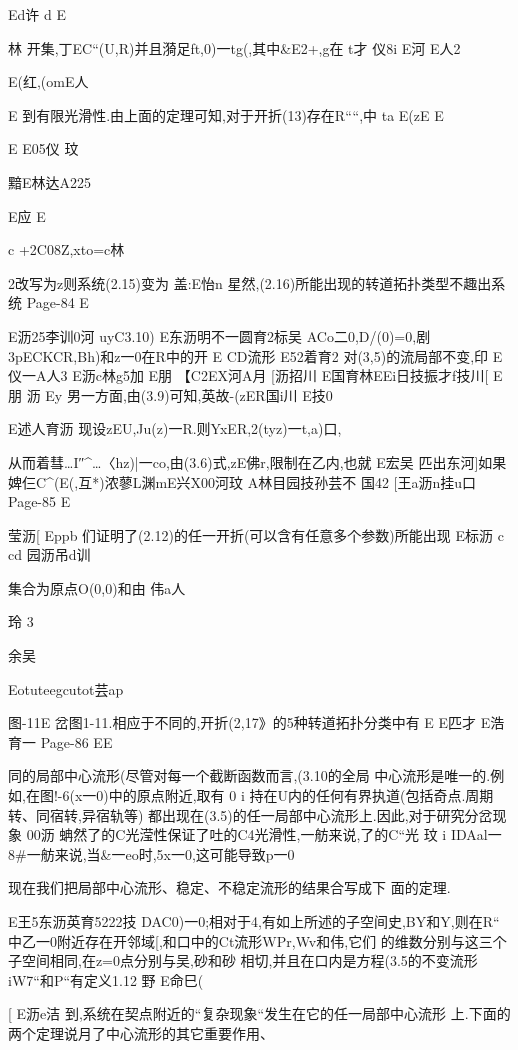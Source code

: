 {{{Ed许
d
E

林
开集,丁EC“(U,R)并且漪足ft,0)一tg(,其中&E2+,g在
t才
仪8i
E河
E人2

E(红,(omE人

E
到有限光滑性.由上面的定理可知,对于开折(13)存在R““,中
ta
E(zE
E

E
E05仪
玟

黯E林达A225

E应
E

c
+2C08Z,xto=c林

2改写为z则系统(2.15)变为
盖:E怡n
星然,(2.16)所能出现的转道拓扑类型不趣出系统
Page-84
E

E沥25李训0河
uyC3.10)
E东沥明不一圆育2标吴
ACo二0,D/(0)=0,剧3pECKCR,Bh)和z一0在R中的开
E
CD流形
E52着育2
对(3,5)的流局部不变,印
E仪一A人3
E沥c林g5加
E朋
【C2EX河A月
[沥招川
E国育林EEi日技振才f技川[
E朋
沥
Ey
男一方面,由(3.9)可知,英故-(zER国i川
E技0

E述人育沥
现设zEU,Ju(z)一R.则YxER,2(tyz)一t,a)口,

从而着彗…I″^…〈hz)|一co,由(3.6)式,zE佛r,限制在乙内,也就
E宏吴
匹出东河]如果婢仨C^(E(,互*)浓蓼L渊mE兴X00河玟
A林目园技孙芸不
国42
[王a沥n挂u口
Page-85
E

莹沥[
Eppb
们证明了(2.12)的任一开折(可以含有任意多个参数)所能出现
E标沥
c
cd
园沥吊d训

集合为原点O(0,0)和由
伟a人

玲
3

余吴

Eotuteegcutot芸ap

图-11E
岔图1-11.相应于不同的,开折(2,17》的5种转道拓扑分类中有
E
E匹才
E浩育一
Page-86
EE

同的局部中心流形(尽管对每一个截断函数而言,(3.10的全局
中心流形是唯一的.例如,在图!-6(x一0)中的原点附近,取有
0
i
持在U内的任何有界执道(包括奇点.周期转、同宿转,异宿轨等)
都出现在(3.5)的任一局部中心流形上.因此,对于研究分岔现象
00沥
蚺然了的C光滢性保证了吐的C4光滑性,一舫来说,了的C“光
玟
i
IDAal一8#一舫来说,当&一eo时,5x一0,这可能导致p一0

现在我们把局部中心流形、稳定、不稳定流形的结果合写成下
面的定理.

E王5东沥英育5222技
DAC0)一0;相对于4,有如上所述的子空间史,BY和Y,则在R“
中乙一0附近存在开邻域[,和口中的Ct流形WPr,Wv和伟,它们
的维数分别与这三个子空间相同,在z=0点分别与吴,砂和砂
相切,并且在口内是方程(3.5的不变流形iW7“和P“有定义1.12
野
E命巳(

[
E沥e洁
到,系统在契点附近的“复杂现象“发生在它的任一局部中心流形
上.下面的两个定理说月了中心流形的其它重要作用、

}}}
